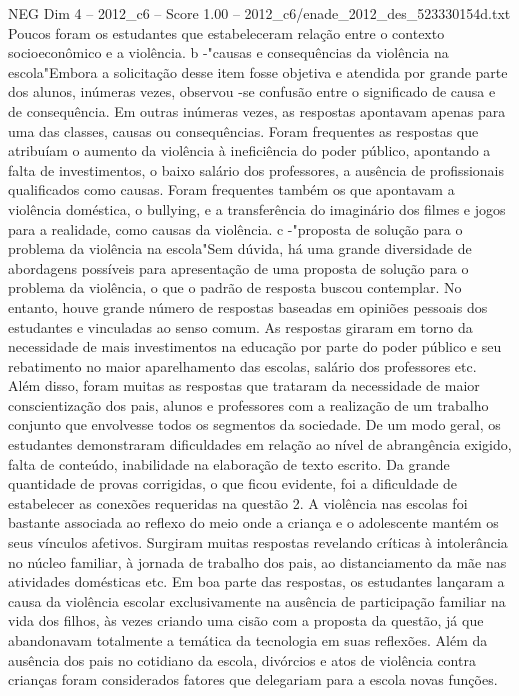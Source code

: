 \begin{textsample}{NEG Dim 4 – 2012\_c6 – Score 1.00 – 2012\_c6/enade\_2012\_des\_523330154d.txt}
Poucos foram os estudantes que estabeleceram relação entre o contexto socioeconômico e a violência. b -"causas e consequências da violência na escola"Embora a solicitação desse item fosse objetiva e atendida por grande parte dos alunos, inúmeras vezes, observou -se confusão entre o significado de causa e de consequência.
Em outras inúmeras vezes, as respostas apontavam apenas para uma das classes, causas ou consequências.
Foram frequentes as respostas que atribuíam o aumento da violência à ineficiência do poder público, apontando a falta de investimentos, o baixo salário dos professores, a ausência de profissionais qualificados como causas.
Foram frequentes também os que apontavam a violência doméstica, o bullying, e a transferência do imaginário dos filmes e jogos para a realidade, como causas da violência. c -"proposta de solução para o problema da violência na escola"Sem dúvida, há uma grande diversidade de abordagens possíveis para apresentação de uma proposta de solução para o problema da violência, o que o padrão de resposta buscou contemplar.
No entanto, houve grande número de respostas baseadas em opiniões pessoais dos estudantes e vinculadas ao senso comum.
As respostas giraram em torno da necessidade de mais investimentos na educação por parte do poder público e seu rebatimento no maior aparelhamento das escolas, salário dos professores etc.
Além disso, foram muitas as respostas que trataram da necessidade de maior conscientização dos pais, alunos e professores com a realização de um trabalho conjunto que envolvesse todos os segmentos da sociedade.
De um modo geral, os estudantes demonstraram dificuldades em relação ao nível de abrangência exigido, falta de conteúdo, inabilidade na elaboração de texto escrito.
Da grande quantidade de provas corrigidas, o que ficou evidente, foi a dificuldade de estabelecer as conexões requeridas na questão 2.
A violência nas escolas foi bastante associada ao reflexo do meio onde a criança e o adolescente mantém os seus vínculos afetivos.
Surgiram muitas respostas revelando críticas à intolerância no núcleo familiar, à jornada de trabalho dos pais, ao distanciamento da mãe nas atividades domésticas etc.
Em boa parte das respostas, os estudantes lançaram a causa da violência escolar exclusivamente na ausência de participação familiar na vida dos filhos, às vezes criando uma cisão com a proposta da questão, já que abandonavam totalmente a temática da tecnologia em suas reflexões.
Além da ausência dos pais no cotidiano da escola, divórcios e atos de violência contra crianças foram considerados fatores que delegariam para a escola novas funções.

\end{textsample}
